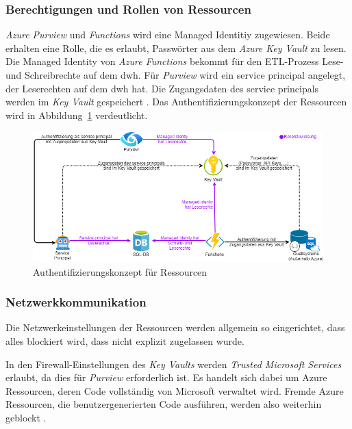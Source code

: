\subsubsection{Berechtigungen und Rollen von Ressourcen} \label{subsec:infra:konfig:aad}
\textit{Azure Purview} und \textit{Functions} wird eine Managed Identitiy zugewiesen. Beide erhalten eine Rolle, die es erlaubt, Passwörter aus dem \textit{Azure Key Vault} zu lesen. Die Managed Identity von \textit{Azure Functions} bekommt für den ETL-Prozess Lese- und Schreibrechte auf dem \ac{dwh}. Für \textit{Purview} wird ein service principal angelegt, der Leserechten auf dem \ac{dwh} hat. Die Zugangsdaten des service principals werden im \textit{Key Vault} gespeichert \cite[vgl.][]{riscutia_data_2021}. Das Authentifizierungskonzept der Ressourcen wird in Abbildung~\ref{fig:chap04_ressourceAuth} verdeutlicht. 

 \begin{figure}[htbp]
 \centering
 \includegraphics[width=\textwidth]{gfx/ressource_auth.png}
 \caption[Authentifizierungskonzept für Ressourcen]{Authentifizierungskonzept für Ressourcen \cite[vgl.][]{riscutia_data_2021}}
\label{fig:chap04_ressourceAuth}
\end{figure}

\subsubsection{Netzwerkkommunikation} \label{subsec:infra:konfig:netzwerk}
Die Netzwerkeinstellungen der Ressourcen werden allgemein so eingerichtet, dass alles blockiert wird, dass nicht explizit zugelassen wurde. 

In den Firewall-Einstellungen des \textit{Key Vaults} werden \textit{Trusted Microsoft Services} erlaubt, da dies für \textit{Purview} erforderlich ist. Es handelt sich dabei um Azure Ressourcen, deren Code vollständig von Microsoft verwaltet wird. Fremde Azure Ressourcen, die benutzergenerierten Code ausführen, werden also weiterhin geblockt \cite[vgl.][]{msdoc_21_keyVault_netSec}.

